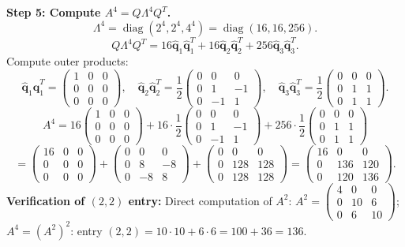 \documentclass[12pt,a4paper]{article}
\begin{document}
\textbf{Step 5: Compute $A^4 = Q\Lambda^4 Q^T$.}
\[
  \Lambda^4 = \operatorname{diag}(2^4, 2^4, 4^4) = \operatorname{diag}(16, 16, 256).
\]
\[
  Q\Lambda^4 Q^T = 16\hat{\mathbf{q}}_1\hat{\mathbf{q}}_1^T + 16\hat{\mathbf{q}}_2\hat{\mathbf{q}}_2^T + 256\hat{\mathbf{q}}_3\hat{\mathbf{q}}_3^T.
\]
Compute outer products:
\[
  \hat{\mathbf{q}}_1\hat{\mathbf{q}}_1^T = \begin{pmatrix}1&0&0\\0&0&0\\0&0&0\end{pmatrix}, \quad
  \hat{\mathbf{q}}_2\hat{\mathbf{q}}_2^T = \frac{1}{2}\begin{pmatrix}0&0&0\\0&1&-1\\0&-1&1\end{pmatrix}, \quad
  \hat{\mathbf{q}}_3\hat{\mathbf{q}}_3^T = \frac{1}{2}\begin{pmatrix}0&0&0\\0&1&1\\0&1&1\end{pmatrix}.
\]
\[
  A^4 = 16\begin{pmatrix}1&0&0\\0&0&0\\0&0&0\end{pmatrix}
      + 16\cdot\frac{1}{2}\begin{pmatrix}0&0&0\\0&1&-1\\0&-1&1\end{pmatrix}
      + 256\cdot\frac{1}{2}\begin{pmatrix}0&0&0\\0&1&1\\0&1&1\end{pmatrix}
\]
\[
  = \begin{pmatrix}16&0&0\\0&0&0\\0&0&0\end{pmatrix}
  + \begin{pmatrix}0&0&0\\0&8&-8\\0&-8&8\end{pmatrix}
  + \begin{pmatrix}0&0&0\\0&128&128\\0&128&128\end{pmatrix}
  = \begin{pmatrix}16&0&0\\0&136&120\\0&120&136\end{pmatrix}.
\]
\textbf{Verification of $(2,2)$ entry:} Direct computation of $A^2$:
$A^2 = \begin{pmatrix}4&0&0\\0&10&6\\0&6&10\end{pmatrix}$;
$A^4 = (A^2)^2$: entry $(2,2) = 10\cdot10+6\cdot6 = 100+36 = 136$. \checkmark
\end{document}
